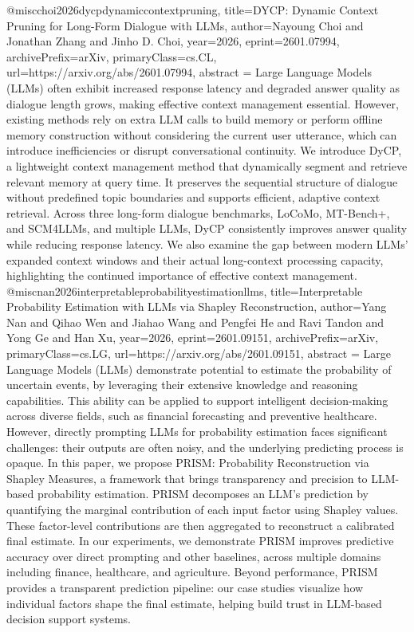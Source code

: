 {}@misc{choi2026dycpdynamiccontextpruning,
      title={DYCP: Dynamic Context Pruning for Long-Form Dialogue with LLMs}, 
      author={Nayoung Choi and Jonathan Zhang and Jinho D. Choi},
      year={2026},
      eprint={2601.07994},
      archivePrefix={arXiv},
      primaryClass={cs.CL},
      url={https://arxiv.org/abs/2601.07994},
      abstract = {Large Language Models (LLMs) often exhibit increased response latency and degraded answer quality as dialogue length grows, making effective context management essential. However, existing methods rely on extra LLM calls to build memory or perform offline memory construction without considering the current user utterance, which can introduce inefficiencies or disrupt conversational continuity. We introduce DyCP, a lightweight context management method that dynamically segment and retrieve relevant memory at query time. It preserves the sequential structure of dialogue without predefined topic boundaries and supports efficient, adaptive context retrieval. Across three long-form dialogue benchmarks, LoCoMo, MT-Bench+, and SCM4LLMs, and multiple LLMs, DyCP consistently improves answer quality while reducing response latency. We also examine the gap between modern LLMs' expanded context windows and their actual long-context processing capacity, highlighting the continued importance of effective context management.}
}@misc{nan2026interpretableprobabilityestimationllms,
      title={Interpretable Probability Estimation with LLMs via Shapley Reconstruction}, 
      author={Yang Nan and Qihao Wen and Jiahao Wang and Pengfei He and Ravi Tandon and Yong Ge and Han Xu},
      year={2026},
      eprint={2601.09151},
      archivePrefix={arXiv},
      primaryClass={cs.LG},
      url={https://arxiv.org/abs/2601.09151},
      abstract = {Large Language Models (LLMs) demonstrate potential to estimate the probability of uncertain events, by leveraging their extensive knowledge and reasoning capabilities. This ability can be applied to support intelligent decision-making across diverse fields, such as financial forecasting and preventive healthcare. However, directly prompting LLMs for probability estimation faces significant challenges: their outputs are often noisy, and the underlying predicting process is opaque. In this paper, we propose PRISM: Probability Reconstruction via Shapley Measures, a framework that brings transparency and precision to LLM-based probability estimation. PRISM decomposes an LLM's prediction by quantifying the marginal contribution of each input factor using Shapley values. These factor-level contributions are then aggregated to reconstruct a calibrated final estimate. In our experiments, we demonstrate PRISM improves predictive accuracy over direct prompting and other baselines, across multiple domains including finance, healthcare, and agriculture. Beyond performance, PRISM provides a transparent prediction pipeline: our case studies visualize how individual factors shape the final estimate, helping build trust in LLM-based decision support systems.}
}
